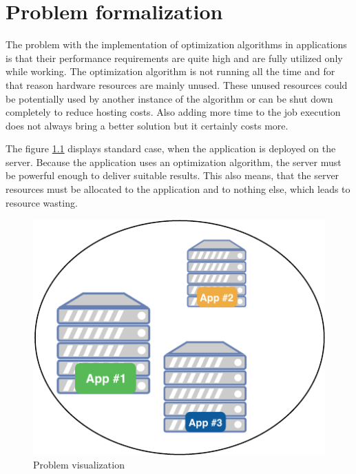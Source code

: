 \chapter{Problem formalization}\label{ch:problem-formalization}

The problem with the implementation of optimization algorithms in applications is that their
performance requirements are quite high and are fully utilized only while working.
The optimization algorithm is not running all the time and for that reason hardware resources are mainly unused.
These unused resources could be potentially used by another instance of the algorithm
or can be shut down completely to reduce hosting costs.
Also adding more time to the job execution does not always bring a better solution
but it certainly costs more.

The figure \ref{fig:problem-scheme} displays standard case,
when the application is deployed on the server.
Because the application uses an optimization algorithm, 
the server must be powerful enough to deliver suitable results.
This also means,
that the server resources must be allocated to the application and to nothing else,
which leads to resource wasting.
\begin{figure}[ht] 
    \includegraphics[scale=0.7]{i_problem_scheme_without.pdf} 
    \centering
    \caption{Problem visualization}
    \label{fig:problem-scheme}
\end{figure}

